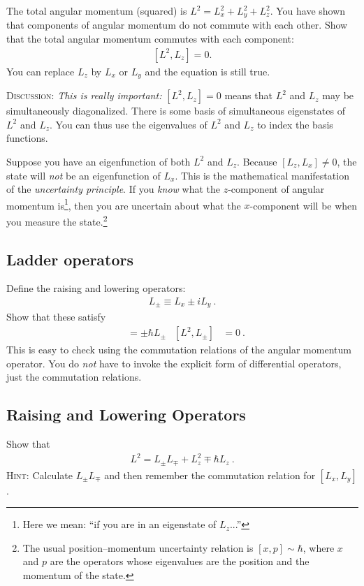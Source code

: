 \documentclass[12pt]{article}
\numberwithin{equation}{section}    %
\begin{document}
The total angular momentum (squared) is $L^2 = L_x^2 + L_y^2 + L_z^2$. You have shown that components of angular momentum do not commute with each other. Show that the total angular momentum commutes with each component:
\begin{align}
	\left[L^2,L_z\right] = 0  .
\end{align}
You can replace $L_z$ by $L_x$ or $L_y$ and the equation is still true.

\textsc{Discussion}: \emph{This is really important:} $[L^2, L_z]=0$ means that $L^2$ and $L_z$ may be simultaneously diagonalized. There is some basis of simultaneous eigenstates of $L^2$ and $L_z$. You can thus use the eigenvalues of $L^2$ and $L_z$ to index the basis functions.

Suppose you have an eigenfunction of both $L^2$ and $L_z$. Because $[L_z,L_x]\neq 0$, the state will \emph{not} be an eigenfunction of $L_x$. This is the mathematical manifestation of the \emph{uncertainty principle}. If you \emph{know} what the $z$-component of angular momentum is\footnote{Here we mean: ``if you are in an eigenstate of $L_z$...''}, then you are uncertain about what the $x$-component will be when you measure the state.\footnote{The usual position--momentum uncertainty relation is $[x,p]\sim \hbar$, where $x$ and $p$ are the operators whose eigenvalues are the position and the momentum of the state.}


\subsection{Ladder operators}

Define the raising and lowering operators:
\begin{align}
	L_\pm \equiv L_x \pm i L_y \ .
\end{align}
Show that these satisfy
\begin{align}
	[L_z, L_\pm] &= \pm \hbar L_\pm
	&
	[L^2, L_\pm] &= 0 \ .
\end{align}
This is easy to check using the commutation relations of the angular momentum operator. You do \emph{not} have to invoke the explicit form of differential operators, just the commutation relations.

\subsection{Raising and Lowering Operators}

Show that
\begin{align}
	L^2 = L_\pm L_\mp + L_z^2 \mp \hbar L_z \ .
	\label{eq:L2:pm}
\end{align}
\textsc{Hint:} Calculate $L_\pm L_\mp$ and then remember the commutation relation for $[L_x, L_y]$.
\end{document}
